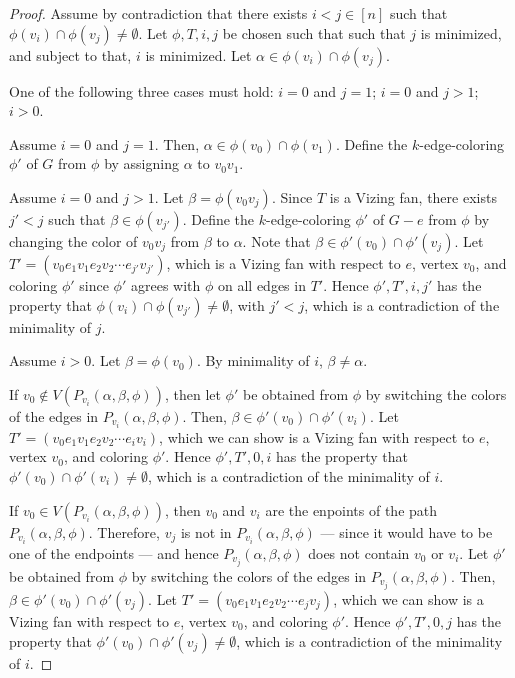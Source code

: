 \begin{proof}
    Assume by contradiction that there exists \(i < j \in [n]\) such that \(\phi(v_i) \cap \phi(v_j) \neq \emptyset\).
    Let \(\phi, T, i, j\) be chosen such that such that
    \(j\) is minimized, and subject to that,
    \(i\) is minimized.
    Let \(\alpha \in \phi(v_i) \cap \phi(v_j)\).

    One of the following three cases must hold:
    \(i = 0\) and \(j = 1\);
    \(i = 0\) and \(j > 1\);
    \(i > 0\).

    Assume \(i = 0\) and \(j = 1\).
    Then, \(\alpha \in \phi(v_0) \cap \phi(v_1)\).
    Define the \(k\)-edge-coloring \(\phi'\) of \(G\)
    from \(\phi\) by
    assigning \(\alpha\) to \(v_0v_1\).

    Assume \(i = 0\) and \(j > 1\).
    Let \(\beta = \phi(v_0v_j)\).
    Since \(T\) is a Vizing fan, there exists \(j' < j\) such that \(\beta \in \phi(v_{j'})\).
    Define the \(k\)-edge-coloring \(\phi'\) of \(G - e\)
    from \(\phi\) by
    changing the color of \(v_0v_j\) from \(\beta\) to \(\alpha\).
    Note that \(\beta \in \phi'(v_0) \cap \phi'(v_j)\).
    Let \(T' = (v_0e_1v_1e_2v_2 \cdots e_{j'}v_{j'})\),
    which is a Vizing fan with respect to \(e\), vertex \(v_0\), and coloring \(\phi'\)
    since \(\phi'\) agrees with \(\phi\) on all edges in \(T'\).
    Hence \(\phi', T', i, j'\) has the property that \(\phi(v_i) \cap \phi(v_{j'}) \neq \emptyset\), with \(j' < j\), which is a contradiction of the minimality of \(j\).

    Assume \(i > 0\).
    Let \(\beta = \phi(v_0)\).
    By minimality of \(i\), \(\beta \neq \alpha\).

    If \(v_0 \notin V(P_{v_i}(\alpha, \beta, \phi))\),
    then let \(\phi'\) be obtained from \(\phi\) by
    switching the colors of the edges in \(P_{v_i}(\alpha, \beta, \phi)\).
    Then, \(\beta \in \phi'(v_0) \cap \phi'(v_i)\).
    Let \(T' = (v_0e_1v_1e_2v_2 \cdots e_iv_i)\),
    which we can show is a Vizing fan with respect to \(e\), vertex \(v_0\), and coloring \(\phi'\).
    Hence \(\phi', T', 0, i\) has the property that \(\phi'(v_0) \cap \phi'(v_i) \neq \emptyset\), which is a contradiction of the minimality of \(i\).

    If \(v_0 \in V(P_{v_i}(\alpha, \beta, \phi))\),
    then \(v_0\) and \(v_i\) are the enpoints of the path \(P_{v_i}(\alpha, \beta, \phi)\).
    Therefore, \(v_j\) is not in \(P_{v_i}(\alpha, \beta, \phi)\) --- since it would have to be one of the endpoints ---
    and hence \(P_{v_j}(\alpha, \beta, \phi)\) does not contain \(v_0\) or \(v_i\).
    Let \(\phi'\) be obtained from \(\phi\) by
    switching the colors of the edges in \(P_{v_j}(\alpha, \beta, \phi)\).
    Then, \(\beta \in \phi'(v_0) \cap \phi'(v_j)\).
    Let \(T' = (v_0e_1v_1e_2v_2 \cdots e_jv_j)\),
    which we can show is a Vizing fan with respect to \(e\), vertex \(v_0\), and coloring \(\phi'\).
    Hence \(\phi', T', 0, j\) has the property that \(\phi'(v_0) \cap \phi'(v_j) \neq \emptyset\), which is a contradiction of the minimality of \(i\).
\end{proof}

